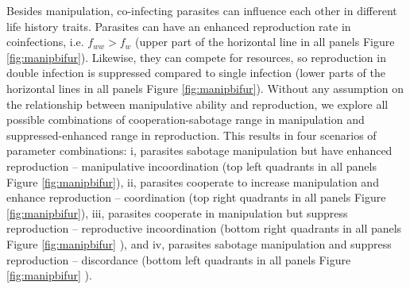 \documentclass[a4paper]{scrartcl}
\begin{document}
Besides manipulation, co-infecting parasites can influence each other in different life history traits.
Parasites can have an enhanced reproduction rate in coinfections, i.e. $f_{ww} > f_w$ (upper part of the horizontal line in all panels Figure \ref{fig:manipbifur}). 
Likewise, they can compete for resources, so reproduction in double infection is suppressed compared to single infection (lower parts of the horizontal lines in all panels Figure \ref{fig:manipbifur}). 
Without any assumption on the relationship between manipulative ability and reproduction, we explore all possible combinations of cooperation-sabotage range in manipulation and suppressed-enhanced range in reproduction. This results in four scenarios of parameter combinations: i, parasites sabotage manipulation but have enhanced reproduction -- manipulative incoordination (top left quadrants in all panels Figure \ref{fig:manipbifur}), ii, parasites cooperate to increase manipulation and enhance reproduction -- coordination (top right quadrants in all panels Figure \ref{fig:manipbifur}), iii, parasites cooperate in manipulation but suppress reproduction -- reproductive incoordination (bottom right quadrants in all panels Figure \ref{fig:manipbifur} ), and iv, parasites sabotage manipulation and suppress reproduction -- discordance (bottom left quadrants in all panels Figure \ref{fig:manipbifur} ).
\end{document}
